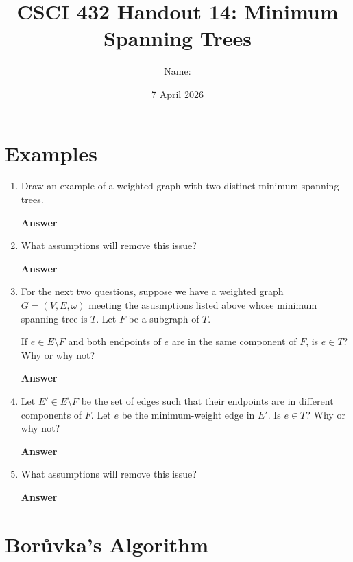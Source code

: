 \documentclass{article}
\title{CSCI 432 Handout 14: Minimum Spanning Trees}
\date{7 April 2026}
\author{Name: \rule{3in}{0.15mm}}
\begin{document}
\maketitle

\section*{Examples}

\begin{enumerate}
    \item Draw an example of a weighted graph with two distinct minimum spanning trees.

        \textbf{Answer}
        \vspace{2in}

    \item What assumptions will remove this issue?

        \textbf{Answer}
        \vspace{2in}

    \item For the next two questions, suppose we have a weighted graph
        $G=(V,E,\omega)$ meeting the asusmptions listed above whose minimum
        spanning tree is $T$.  Let $F$ be a subgraph of $T$.

        If $e \in E \setminus F$ and both endpoints of $e$ are in the same
        component of $F$, is $e \in T$? Why or why not?

        \textbf{Answer}
        \vspace{2in}

    \item Let $E' \in E \setminus F$ be the set of edges such that their
        endpoints are in different components of $F$.  Let $e$ be the
        minimum-weight edge in $E'$. Is $e \in T$? Why or why not?

        \textbf{Answer}
        \vspace{2in}



    \item What assumptions will remove this issue?

        \textbf{Answer}
        \vspace{2in}



\end{enumerate}

\pagebreak
\section*{Bor\r{u}vka's Algorithm}
\end{document}

